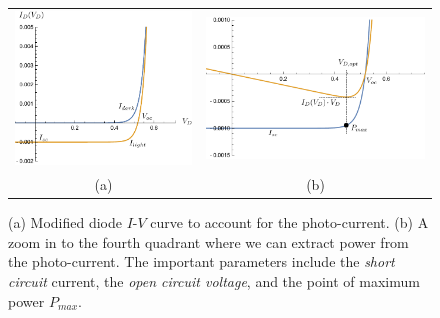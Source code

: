 \begin{figure}[H]
\centering
\begin{tabular}{cc}
\includegraphics[width=.47\columnwidth]{solarcell_zoomout.pdf} &
\includegraphics[width=.47\columnwidth]{solarcell.pdf}\\
(a) & (b)\\
\end{tabular}
\caption{(a) Modified diode $I$-$V$ curve to account for the photo-current.  (b)  A zoom in to the fourth quadrant where we can extract power from the photo-current.  The important parameters include the \emph{short circuit} current, the \emph{open circuit voltage}, and the point of maximum power $P_{max}$. }
\label{fig:solarcell_zoom}
\end{figure}
\newpage
